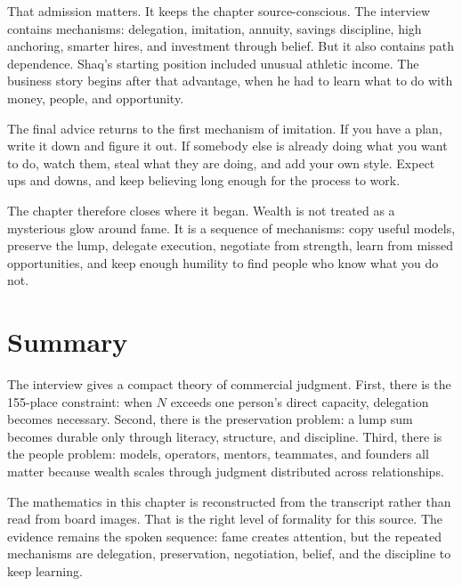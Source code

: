 That admission matters. It keeps the chapter source-conscious. The interview contains mechanisms: delegation, imitation, annuity, savings discipline, high anchoring, smarter hires, and investment through belief. But it also contains path dependence. Shaq's starting position included unusual athletic income. The business story begins after that advantage, when he had to learn what to do with money, people, and opportunity.

The final advice returns to the first mechanism of imitation. If you have a plan, write it down and figure it out. If somebody else is already doing what you want to do, watch them, steal what they are doing, and add your own style. Expect ups and downs, and keep believing long enough for the process to work.

The chapter therefore closes where it began. Wealth is not treated as a mysterious glow around fame. It is a sequence of mechanisms: copy useful models, preserve the lump, delegate execution, negotiate from strength, learn from missed opportunities, and keep enough humility to find people who know what you do not.

\section{Summary}

The interview gives a compact theory of commercial judgment. First, there is the 155-place constraint: when \(N\) exceeds one person's direct capacity, delegation becomes necessary. Second, there is the preservation problem: a lump sum becomes durable only through literacy, structure, and discipline. Third, there is the people problem: models, operators, mentors, teammates, and founders all matter because wealth scales through judgment distributed across relationships.

The mathematics in this chapter is reconstructed from the transcript rather than read from board images. That is the right level of formality for this source. The evidence remains the spoken sequence: fame creates attention, but the repeated mechanisms are delegation, preservation, negotiation, belief, and the discipline to keep learning.